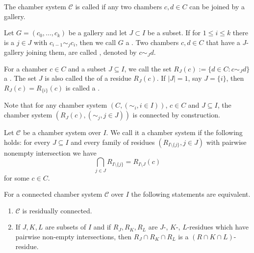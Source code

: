 \begin{defi}
	The chamber system $\mathcal{C}$ is called  if any two chambers $c,d \in C$ can be joined by a gallery.
\end{defi}

\begin{defi}
	Let $G = (c_0,\ldots,c_k)$ be a gallery and let $J \subset I$ be a subset. If for $1 \leq i \leq k$ there is a $j \in J$ with $c_{i-1} \sim_j c_i$, then we call $G$ a . Two chambers $c,d \in C$ that have a $J$-gallery joining them, are called , denoted by $c \sim_J d$.
\end{defi}

\begin{defi}
	For a chamber $c \in C$ and a subset $J \subseteq I$, we call the set $R_J(c) := \{ d \in C : c \sim_J d \}$ a . The set $J$ is also called the  of a residue $R_J(c)$. If $|J| = 1$, say $J = \{i\}$, then $R_J(c) = R_{\{i\}}(c)$ is called a .
\end{defi}

Note that for any chamber system $(C,(\sim_i, i \in I))$, $c \in C$ and $J \subseteq I$, the chamber system $(R_J(c), (\sim_j, j \in J))$ is connected by construction.

\begin{defi}
	Let $\mathcal{C}$ be a chamber system over $I$. We call it a  chamber system if the following holds: for every $J \subseteq I$ and every family of residues $(R_{I \setminus \{j\}}, j \in J)$ with pairwise nonempty intersection we have
	$$ \bigcap_{j \in J} R_{I \setminus \{j\}} = R_{I \setminus J}(c) $$
	for some $c \in C$.
\end{defi}

\begin{lemm}
	For a connected chamber system $\mathcal{C}$ over $I$ the following statements are equivalent.
	\begin{enumerate}
		\item $\mathcal{C}$ is residually connected.
		\item If $J,K,L$ are subsets of $I$ and if $R_J, R_K, R_L$ are $J$-, $K$-, $L$-residues which have pairwise non-empty intersections, then $R_J \cap R_K \cap R_L$ is a $(R \cap K \cap L)$-residue.
	\end{enumerate}
\end{lemm}